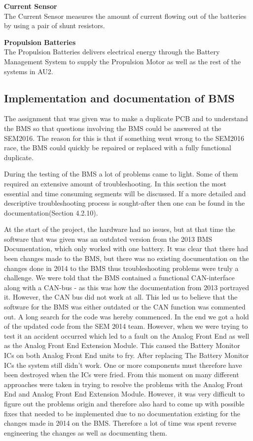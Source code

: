 \textbf{Current Sensor}\\
The Current Sensor measures the amount of current flowing out of the batteries by using a pair of shunt resistors. 

\textbf{Propulsion Batteries}\\
The Propulsion Batteries delivers electrical energy through the Battery Management System to supply the Propulsion Motor as well as the rest of the systems in AU2.

\subsection{Implementation and documentation of BMS}
The assignment that was given was to make a duplicate PCB and to understand the BMS so that questions involving the BMS could be answered at the SEM2016. The reason for this is that if something went wrong to the SEM2016 race, the BMS could quickly be repaired or replaced with a fully functional duplicate.

During the testing of the BMS a lot of problems came to light. Some of them required an extensive amount of troubleshooting. In this section the most essential and time consuming segments will be discussed. If a more detailed and descriptive troubleshooting process is sought-after then one can be found in the documentation\cite{AU2}(Section 4.2.10).

At the start of the project, the hardware had no issues, but at that time the software that was given was an outdated version from the 2013 BMS Documentation\cite{BMSDocumentation}, which only worked with one battery. It was clear that there had been changes made to the BMS, but there was no existing documentation on the changes done in 2014 to the BMS thus troubleshooting problems were truly a challenge.
We were told that the BMS contained a functional CAN-interface along with a CAN-bus - as this was how the documentation from 2013 portrayed it. However, the CAN bus did not work at all. This led us to believe that the software for the BMS was either outdated or the CAN function was commented out. A long search for the code was hereby commenced. In the end we got a hold of the updated code from the SEM 2014 team. However, when we were trying to test it an accident occurred which led to a fault on the Analog Front End as well as the Analog Front End Extension Module. This caused the Battery Monitor ICs on both Analog Front End units to fry.
After replacing The Battery Monitor ICs the system still didn't work. One or more components must therefore have been destroyed when the ICs were fried. From this moment on many different approaches were taken in trying to resolve the problems with the Analog Front End and Analog Front End Extension Module. However, it was very difficult to figure out the problems origin and therefore also hard to come up with possible fixes that needed to be implemented due to no documentation existing for the changes made in 2014 on the BMS. Therefore a lot of time was spent reverse engineering the changes as well as documenting them. 

